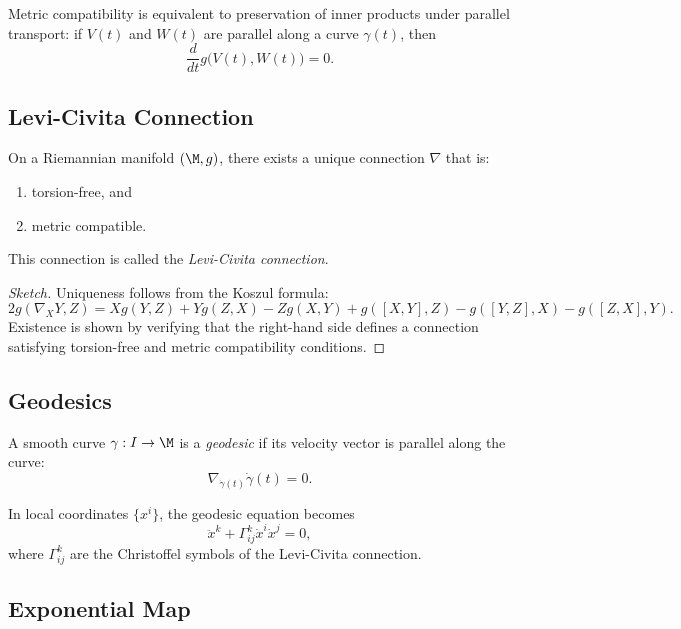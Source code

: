 \begin{lemma}
Metric compatibility is equivalent to preservation of inner products under
parallel transport: if $V(t)$ and $W(t)$ are parallel along a curve
$\gamma(t)$, then
\[
\frac{d}{dt} g\big(V(t),W(t)\big) = 0.
\]
\end{lemma}

\subsection{Levi-Civita Connection}

\begin{theorem}
On a Riemannian manifold $(\M,g)$, there exists a unique connection
$\nabla$ that is:
\begin{enumerate}
    \item torsion-free, and
    \item metric compatible.
\end{enumerate}
This connection is called the \emph{Levi-Civita connection}.
\end{theorem}

\begin{proof}[Sketch]
Uniqueness follows from the Koszul formula:
\[
2 g(\nabla_X Y, Z)
= X g(Y,Z) + Y g(Z,X) - Z g(X,Y)
+ g([X,Y],Z) - g([Y,Z],X) - g([Z,X],Y).
\]
Existence is shown by verifying that the right-hand side defines a
connection satisfying torsion-free and metric compatibility conditions.
\end{proof}

\subsection{Geodesics}

\begin{definition}
A smooth curve $\gamma : I \to \M$ is a \emph{geodesic} if its velocity
vector is parallel along the curve:
\[
\nabla_{\dot{\gamma}(t)} \dot{\gamma}(t) = 0.
\]
\end{definition}

\begin{lemma}
In local coordinates $\{x^i\}$, the geodesic equation becomes
\[
\ddot{x}^k + \Gamma^k_{ij} \dot{x}^i \dot{x}^j = 0,
\]
where $\Gamma^k_{ij}$ are the Christoffel symbols of the Levi-Civita
connection.
\end{lemma}

\subsection{Exponential Map}

